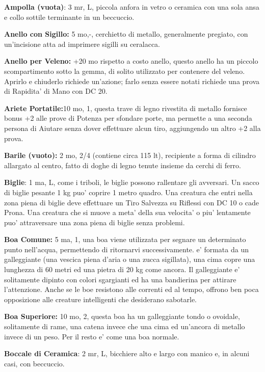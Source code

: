 \documentclass[a4paper,11pt,twoside,openany]{book}
\begin{document}
{\textbf{Ampolla (vuota)}: 3 mr, L, piccola anfora in vetro o ceramica con una sola ansa e collo sottile terminante in un beccuccio.

\textbf{Anello con Sigillo:} 5 mo,-, cerchietto di metallo, generalmente pregiato, con un'incisione atta ad imprimere sigilli su ceralacca. 

\textbf{Anello per Veleno:} +20 mo rispetto a costo anello, questo anello ha un piccolo scompartimento sotto la gemma, di solito utilizzato per contenere del veleno. Aprirlo e chiuderlo richiede un'azione; farlo senza essere notati richiede una prova di Rapidita' di Mano con DC 20.

\textbf{Ariete Portatile:}10 mo, 1, questa trave di legno rivestita di metallo fornisce bonus +2 alle prove di Potenza per sfondare porte, ma permette a una seconda persona di Aiutare senza dover effettuare alcun tiro, aggiungendo un altro +2 alla prova.

\textbf{Barile (vuoto):} 2 mo, 2/4 (contiene circa 115 lt), recipiente a forma di cilindro allargato al centro, fatto di doghe di legno tenute insieme da cerchi di ferro.

\textbf{Biglie}: 1 ma, L, come i triboli, le biglie possono rallentare gli avversari. Un sacco di biglie pesante 1 kg puo' coprire 1 metro quadro. Una creatura che entri nella zona piena di biglie deve effettuare un Tiro Salvezza su Riflessi con DC 10 o cade Prona. Una creatura che si muove a meta' della sua velocita' o piu' lentamente puo' attraversare una zona piena di biglie senza problemi.

\textbf{Boa Comune:} 5 ma, 1, una boa viene utilizzata per segnare un determinato punto nell'acqua, permettendo di ritornarvi successivamente. e' formata da un galleggiante (una vescica piena d'aria o una zucca sigillata), una cima copre una lunghezza di 60 metri ed una pietra di 20 kg come ancora. Il galleggiante e' solitamente dipinto con colori sgargianti ed ha una bandierina per attirare l'attenzione. Anche se le boe resistono alle correnti ed al tempo, offrono ben poca opposizione alle creature intelligenti che desiderano sabotarle.

\textbf{Boa Superiore:} 10 mo, 2, questa boa ha un galleggiante tondo o ovoidale, solitamente di rame, una catena invece che una cima ed un'ancora di metallo invece di un peso. Per il resto e' come una boa normale.

\textbf{Boccale di Ceramica}: 2 mr, L, bicchiere alto e largo con manico e, in alcuni casi, con beccuccio.

}
\end{document}
